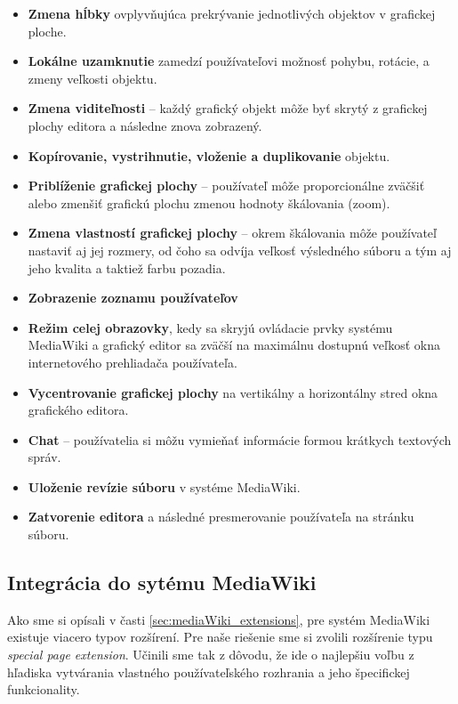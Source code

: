 \begin{itemize}
	\item \textbf{Zmena hĺbky} ovplyvňujúca prekrývanie jednotlivých objektov v grafickej ploche.
	
	\item \textbf{Lokálne uzamknutie} zamedzí používateľovi možnosť pohybu, rotácie, a zmeny veľkosti objektu.
	
	\item \textbf{Zmena viditeľnosti} -- každý grafický objekt môže byť skrytý z grafickej plochy editora a následne znova zobrazený.
	
	\item \textbf{Kopírovanie, vystrihnutie, vloženie a duplikovanie} objektu.
	
	\item \textbf{Priblíženie grafickej plochy} -- používateľ môže proporcionálne zväčšiť alebo zmenšiť grafickú plochu zmenou hodnoty škálovania (zoom).
	
	\item \textbf{Zmena vlastností grafickej plochy} -- okrem škálovania môže používateľ nastaviť aj jej rozmery, od čoho sa odvíja veľkosť výsledného súboru a tým aj jeho kvalita a taktiež farbu pozadia. 
	
	\item \textbf{Zobrazenie zoznamu používateľov}
	
	\item \textbf{Režim celej obrazovky}, kedy sa skryjú ovládacie prvky systému MediaWiki a grafický editor sa zväčší na maximálnu dostupnú veľkosť okna internetového prehliadača používateľa.
	
	\item \textbf{Vycentrovanie grafickej plochy} na vertikálny a horizontálny stred okna grafického editora.
	
	\item \textbf{Chat} -- používatelia si môžu vymieňať informácie formou krátkych textových správ. 
	
	\item \textbf{Uloženie revízie súboru} v systéme MediaWiki. 
	
	\item \textbf{Zatvorenie editora} a následné presmerovanie používateľa na stránku súboru.
\end{itemize}

\subsection{Integrácia do sytému MediaWiki}
Ako sme si opísali v časti \ref{sec:mediaWiki_extensions}, pre systém MediaWiki existuje viacero typov rozšírení. Pre naše riešenie sme si zvolili rozšírenie typu \textit{special page extension}. Učinili sme tak z dôvodu, že ide o najlepšiu voľbu z hľadiska vytvárania vlastného používateľského rozhrania a jeho špecifickej funkcionality. 

